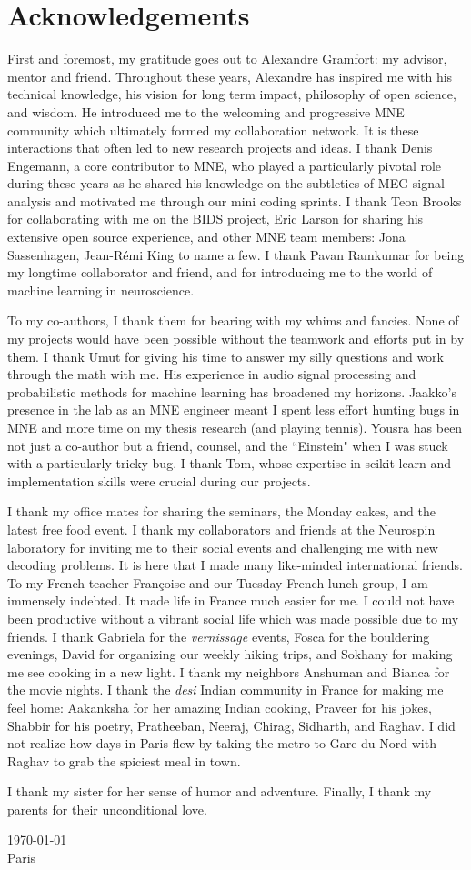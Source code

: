 \chapter*{Acknowledgements}
First and foremost, my gratitude goes out to Alexandre Gramfort: my advisor, mentor and friend. Throughout these years, Alexandre has inspired me with his technical knowledge, his vision for long term impact, philosophy of open science, and wisdom. He introduced me to the welcoming and progressive MNE community which ultimately formed my collaboration network. It is these interactions that often led to new research projects and ideas. I thank Denis Engemann, a core contributor to MNE, who played a particularly pivotal role during these years as he shared his knowledge on the subtleties of MEG signal analysis and motivated me through our mini coding sprints. I thank Teon Brooks for collaborating with me on the BIDS project, Eric Larson for sharing his extensive open source experience, and other MNE team members: Jona Sassenhagen, Jean-Rémi King to name a few. I thank Pavan Ramkumar for being my longtime collaborator and friend, and for introducing me to the world of machine learning in neuroscience.

To my co-authors, I thank them for bearing with my whims and fancies. None of my projects would have been possible without the teamwork and efforts put in by them. I thank Umut for giving his time to answer my silly questions and work through the math with me. His experience in audio signal processing and probabilistic methods for machine learning has broadened my horizons. Jaakko's presence in the lab as an MNE engineer meant I spent less effort hunting bugs in MNE and more time on my thesis research (and playing tennis). Yousra has been not just a co-author but a friend, counsel, and the ``Einstein" when I was stuck with a particularly tricky bug. I thank Tom, whose expertise in scikit-learn and implementation skills were crucial during our projects. 

I thank my office mates for sharing the seminars, the Monday cakes, and the latest free food event. I thank my collaborators and friends at the Neurospin laboratory for inviting me to their social events and challenging me with new decoding problems. It is here that I made many like-minded international friends. To my French teacher Françoise and our Tuesday French lunch group, I am immensely indebted. It made life in France much easier for me. I could not have been productive without a vibrant social life which was made possible due to my friends. I thank Gabriela for the \textit{vernissage} events, Fosca for the bouldering evenings, David for organizing our weekly hiking trips, and Sokhany for making me see cooking in a new light. I thank my neighbors Anshuman and Bianca for the movie nights. I thank the \textit{desi} Indian community in France for making me feel home: Aakanksha for her amazing Indian cooking, Praveer for his jokes, Shabbir for his poetry, Pratheeban, Neeraj, Chirag, Sidharth, and Raghav. I did not realize how days in Paris flew by taking the metro to Gare du Nord with Raghav to grab the spiciest meal in town.

I thank my sister for her sense of humor and adventure. Finally, I thank my parents for their unconditional love.

\today \\
Paris
